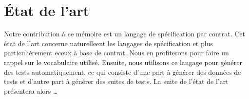\chapter{État de l'art}
\label{chapter:state}

\minitoc

Notre contribution à ce mémoire est un langage de spécification par contrat.
Cet état de l'art concerne naturelleent les langages de spécification et plus
particulièrement eceux à base de contrat. Nous en profiterons pour faire un
rappel sur le vocabulaire utilisé. Ensuite, nous utilisons ce langage pour
générer des tests automatiquement, ce qui consiste d'une part à générer des
données de tests et d'autre part à générer des suites de tests. La suite de
l'état de l'art présentera alors …

